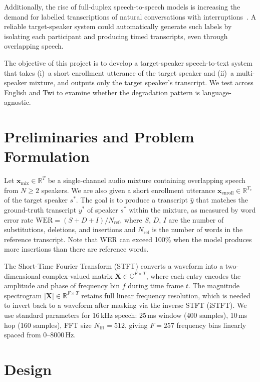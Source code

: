 \documentclass{article}
\begin{document}
Additionally, the rise of full-duplex speech-to-speech models is increasing the demand for labelled transcriptions of natural conversations with interruptions~\citep{Moshi, PersonaPlex}. A reliable target-speaker system could automatically generate such labels by isolating each participant and producing timed transcripts, even through overlapping speech.

The objective of this project is to develop a target-speaker speech-to-text system that takes (i)~a short enrollment utterance of the target speaker and (ii)~a multi-speaker mixture, and outputs only the target speaker's transcript. We test across English and Twi to examine whether the degradation pattern is language-agnostic.


\section{Preliminaries and Problem Formulation}

Let $\mathbf{x}_{\text{mix}} \in \mathbb{R}^T$ be a single-channel audio mixture containing overlapping speech from $N \geq 2$ speakers. We are also given a short enrollment utterance $\mathbf{x}_{\text{enroll}} \in \mathbb{R}^{T_e}$ of the target speaker $s^*$. The goal is to produce a transcript $\hat{y}$ that matches the ground-truth transcript $y^*$ of speaker $s^*$ within the mixture, as measured by word error rate $\text{WER} = (S + D + I) / N_{\text{ref}}$, where $S$, $D$, $I$ are the number of substitutions, deletions, and insertions and $N_{\text{ref}}$ is the number of words in the reference transcript. Note that WER can exceed 100\% when the model produces more insertions than there are reference words.

The Short-Time Fourier Transform (STFT) converts a waveform into a two-dimensional complex-valued matrix $\mathbf{X} \in \mathbb{C}^{F \times T}$, where each entry encodes the amplitude and phase of frequency bin $f$ during time frame $t$. The magnitude spectrogram $|\mathbf{X}| \in \mathbb{R}^{F \times T}$ retains full linear frequency resolution, which is needed to invert back to a waveform after masking via the inverse STFT (iSTFT). We use standard parameters for 16\,kHz speech: 25\,ms window (400 samples), 10\,ms hop (160 samples), FFT size $N_{\text{fft}} = 512$, giving $F = 257$ frequency bins linearly spaced from 0--8000\,Hz.


\section{Design}
\end{document}
